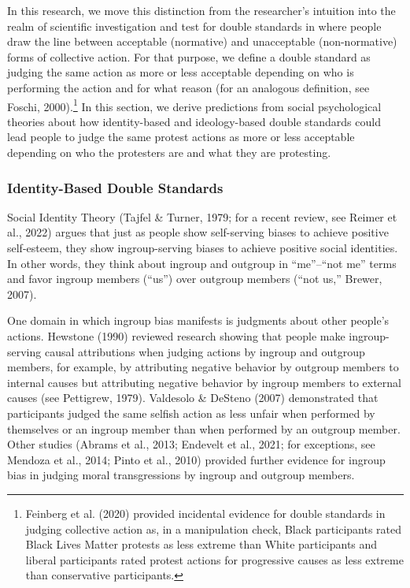 \documentclass[twocolumn, 11pt, letterpaper]{article}
\begin{document}
In this research, we move this distinction from the researcher's
intuition into the realm of scientific investigation and test for double
standards in where people draw the line between acceptable (normative)
and unacceptable (non-normative) forms of collective action. For that
purpose, we define a double standard as judging the same action as more
or less acceptable depending on who is performing the action and for
what reason (for an analogous definition, see Foschi, 2000).\footnote{Feinberg
  et al. (2020) provided incidental evidence for double standards in
  judging collective action as, in a manipulation check, Black
  participants rated Black Lives Matter protests as less extreme than
  White participants and liberal participants rated protest actions for
  progressive causes as less extreme than conservative participants.} In
this section, we derive predictions from social psychological theories
about how identity-based and ideology-based double standards could lead
people to judge the same protest actions as more or less acceptable
depending on who the protesters are and what they are protesting.

\hypertarget{identity-based-double-standards}{%
\subsubsection{Identity-Based Double
Standards}\label{identity-based-double-standards}}

Social Identity Theory (Tajfel \& Turner, 1979; for a recent review, see
Reimer et al., 2022) argues that just as people show self-serving biases
to achieve positive self-esteem, they show ingroup-serving biases to
achieve positive social identities. In other words, they think about
ingroup and outgroup in ``me''--``not me'' terms and favor ingroup
members (``us'') over outgroup members (``not us,'' Brewer, 2007).

One domain in which ingroup bias manifests is judgments about other
people's actions. Hewstone (1990) reviewed research showing that people
make ingroup-serving causal attributions when judging actions by ingroup
and outgroup members, for example, by attributing negative behavior by
outgroup members to internal causes but attributing negative behavior by
ingroup members to external causes (see Pettigrew, 1979). Valdesolo \&
DeSteno (2007) demonstrated that participants judged the same selfish
action as less unfair when performed by themselves or an ingroup member
than when performed by an outgroup member. Other studies (Abrams et al.,
2013; Endevelt et al., 2021; for exceptions, see Mendoza et al., 2014;
Pinto et al., 2010) provided further evidence for ingroup bias in
judging moral transgressions by ingroup and outgroup members.
\end{document}
